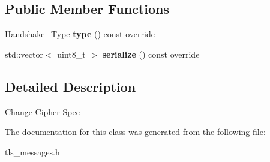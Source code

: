 \subsection*{Public Member Functions}
\begin{DoxyCompactItemize}
\item 
\mbox{\label{class_botan_1_1_t_l_s_1_1_change___cipher___spec_adc7c2bb60f9217dd3091e436a4c3978b}} 
Handshake\+\_\+\+Type {\bfseries type} () const override
\item 
\mbox{\label{class_botan_1_1_t_l_s_1_1_change___cipher___spec_a4b54f74845a6863c73237c8efc1c338f}} 
std\+::vector$<$ uint8\+\_\+t $>$ {\bfseries serialize} () const override
\end{DoxyCompactItemize}


\subsection{Detailed Description}
Change Cipher Spec 

The documentation for this class was generated from the following file\+:\begin{DoxyCompactItemize}
\item 
tls\+\_\+messages.\+h\end{DoxyCompactItemize}
